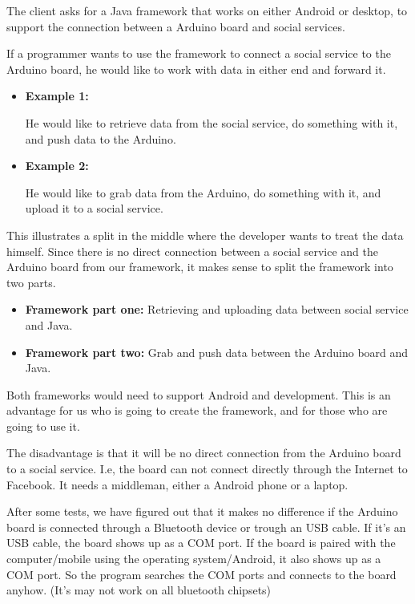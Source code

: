 The client asks for a Java framework that works on either Android or desktop, to support the connection between a Arduino board and social services.

If a programmer wants to use the framework to connect a social service to the Arduino board, he would like to work with data in either end and forward it.

\begin{itemize}
  \item\textbf{Example 1:} 

  He would like to retrieve data from the social service, do something with it, and push data to the Arduino.

  \item\textbf{Example 2:}

  He would like to grab data from the Arduino, do something with it, and upload it to a social service.
\end{itemize}

This illustrates a split in the middle where the developer wants to treat the data himself. Since there is no direct connection between a social service and the Arduino board from our framework, it makes sense to split the framework into two parts.

\begin{itemize}
  \item\textbf{Framework part one:} Retrieving and uploading data between social service and Java.
  \item\textbf{Framework part two:} Grab and push data between the Arduino board and Java.
\end{itemize}

Both frameworks would need to support Android and development. This is an advantage for us who is going to create the framework, and for those who are going to use it.

The disadvantage is that it will be no direct connection from the Arduino board to a social service.
I.e, the board can not connect directly through the Internet to Facebook. It needs a middleman, either a Android phone or a laptop.

After some tests, we have figured out that it makes no difference if the Arduino board is connected through a Bluetooth device or trough an USB cable. If it's an USB cable, the board shows up as a COM port. If the board is paired with the computer/mobile using the operating system/Android, it also shows up as a COM port. So the program searches the COM ports and connects to the board anyhow. (It's may not work on all bluetooth chipsets)


